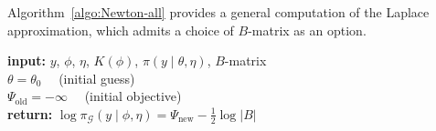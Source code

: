 \documentclass[stslayout, noinfoline]{imsart}
\theoremstyle{definition}
\begin{document}
Algorithm~\ref{algo:Newton-all} provides a general computation of the Laplace approximation,
which admits a choice of $B$-matrix as an option. 
\begin{algorithm}
\caption{General Newton solver. \textit{Writing all three Newton solvers in one algorithm highlights common features between the methods, which leads to lighter code and more general methods for calculating gradients.}} \label{algo:Newton-all}
  {\bf input:} $y$, $\phi$, $\eta$,  $K(\phi)$, $\pi(y \mid \theta, \eta)$, $B$-matrix \\
  $\theta = \theta_0$ \ \ (initial guess) \\
  $\Psi_\text{old} = - \infty$ \ \ (initial objective) \\
 \textbf{return:} $\log \pi_\mathcal{G}(y \mid \phi, \eta) = \Psi_\text{new} - \frac{1}{2} \log |B|$
\end{algorithm}
\end{document}
